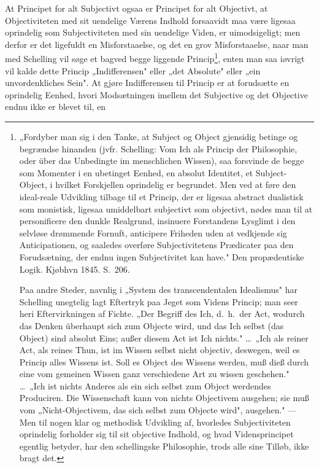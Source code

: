 \documentclass[12pt]{book}
\newcommand{\opage}[1]{\marginnote{\footnotesize\textit{[#1]}}}
\begin{document}
At Principet for alt Subjectivt ogsaa er Principet for alt Objectivt, at
Objectiviteten med sit uendelige Værens%
\opage{9} Indhold forsaavidt maa være ligesaa oprindelig som Subjectiviteten med sin uendelige
Viden, er uimodsigeligt; men derfor er det ligefuldt en Misforstaaelse, og det en
grov Misforstaaelse, naar man med Schelling vil søge et bagved begge liggende
Princip\footnote{„Fordyber man sig i den Tanke, at Subject og Object gjensidig
betinge og begrændse hinanden (jvfr. Schelling: Vom Ich als Princip der Philosophie,
oder über das Unbedingte im menschlichen Wissen), saa forsvinde de begge som Momenter
i en ubetinget Eenhed, en absolut Identitet, et Subject-Object, i hvilket Forskjellen
oprindelig er begrundet. Men ved at føre den ideal-reale Udvikling tilbage til et
Princip, der er ligesaa abstract dualistisk som monistisk, ligesaa umiddelbart
subjectivt som objectivt, nødes man til at personificere den dunkle Realgrund,
insinuere Forstandens Lysglimt i den selvløse drømmende Fornuft, anticipere Friheden
uden at vedkjende sig Anticipationen, og saaledes overføre Subjectivitetens
Prædicater paa den Forudsætning, der endnu ingen Subjectivitet kan have." Den
propædeutiske Logik. Kjøbhvn 1845. S.~206.

Paa andre Steder, navnlig i „System des transcendentalen Idealismus" har Schelling
unegtelig lagt Eftertryk paa Jeget som Videns Princip; man seer heri Eftervirkningen
af Fichte. „Der Begriff des Ich, d.\ h.\ der Act, wodurch das Denken überhaupt sich
zum Objecte wird, und das Ich selbst (das Object) sind absolut Eins; außer diesem Act
ist Ich nichts." \dots\ „Ich als reiner Act, als reines Thun, ist im Wissen selbst
nicht objectiv, deswegen, weil es Princip alles Wissens ist. Soll es Object des
Wissens werden, muß dieß durch eine vom gemeinen Wissen ganz verschiedene Art zu
wissen geschehen." \dots\ „Ich ist nichts Anderes als ein sich selbst zum Object
werdendes Produciren. Die Wissenschaft kann von nichts Objectivem ausgehen; sie muß
vom „Nicht-Objectivem, das sich selbst zum Objecte wird", ausgehen." --- Men til
nogen klar og methodisk Udvikling af, hvorledes Subjectiviteten oprindelig forholder
sig til sit objective Indhold, og hvad Vidensprincipet egentlig betyder, har den
schellingske Philosophie, trods alle sine Tilløb, ikke bragt det.}, enten man saa
iøvrigt vil kalde dette
\opage{10} Princip „Indifferensen" eller „det Absolute" eller „ein unvordenkliches Sein". At
gjøre Indifferensen til Princip er at forudsætte en oprindelig Eenhed, hvori
Modsætningen imellem det Subjective og det Objective endnu ikke er blevet til, en
\end{document}
